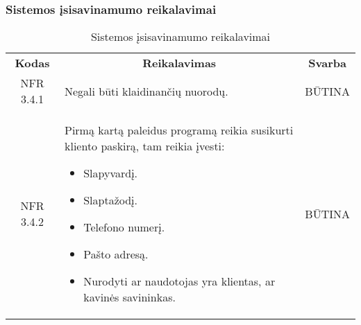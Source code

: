 \documentclass{VUMIFPSkursinis}
\begin{document}
\subsubsection{Sistemos įsisavinamumo reikalavimai}
\begin{center}
	\begin{table}[H]
	\begin{tabular}{|p{2cm}|p{}|p{}|}
	\hline
	    \rowcolor{lightgray}
		\multicolumn{3}{|c|}{Sistemos įsisavinamumo reikalavimai}\\
		
	\hline
		\multicolumn{1}{|c|}{{\bfseries Kodas}}&
		\multicolumn{1}{|c|}{{\bfseries Reikalavimas}}&
		\multicolumn{1}{|c|}{{\bfseries Svarba}}\\
	\hline 	
		\multicolumn{1}{|c|}{NFR 3.4.1}&
		{Negali būti klaidinančių nuorodų.}&
		\multicolumn{1}{|c|}{BŪTINA}\\	
	
	\hline 	
		\multicolumn{1}{|c|}{NFR 3.4.2}&
		{Pirmą kartą paleidus programą reikia susikurti kliento paskirą, tam reikia įvesti:
			\begin{itemize}
				\item Slapyvardį.
				\item Slaptažodį.
				\item Telefono numerį.
				\item Pašto adresą.
				\item Nurodyti ar naudotojas yra klientas, ar kavinės savininkas.
			\end{itemize}}&
		\multicolumn{1}{|c|}{BŪTINA}\\	
	
	\hline 	
	
	\end{tabular}
	\caption{Sistemos įsisavinamumo reikalavimai}
	\label{table:Sistemosįsisavinamumoreikalavimai}
	\end{table}

\end{center}
\end{document}
